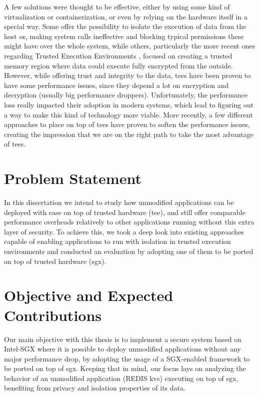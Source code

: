 A few solutions were thought to be effective, either by using some kind of virtualization or containerization, or even by relying on the hardware itself in a special way. 
Some \cite{virtGhostPaper}\cite{flickerPaper}\cite{mushiPaper}\cite{SeCagePaper}\cite{inkTagPaper}\cite{segoPaper} offer the possibility to isolate the execution of data from the host \gls{os}, making system calls ineffective and blocking typical permissions these might have over the whole system, while others, particularly the more recent ones regarding Trusted Execution Environments \cite{armTZPaper}\cite{amdPaper}\cite{sanctumPaper}\cite{intelSGX}, focused on creating a trusted memory region where data could execute fully encrypted from the outside. 
However, while offering trust and integrity to the data, \gls{tee}s have been proven to have some performance issues, since they depend a lot on encryption and decryption (usually big performance droppers). Unfortunately, the performance loss really impacted their adoption in modern systems, which lead to figuring out a way to make this kind of technology more viable. 
More recently, a few different approaches to place on top of \gls{tee}s have proven to soften the performance issues, creating the impression that we are on the right path to take the most advantage of \gls{tee}s. 


\section{Problem Statement}

In this dissertation we intend to study how unmodified applications can be deployed with ease on top of trusted hardware (\gls{tee}), and still offer comparable performance overheads relatively to other applications running without this extra layer of security. To achieve this, we took a deep look into existing approaches capable of enabling applications to run with isolation in trusted execution environments and conducted an evaluation by adopting one of them to be ported on top of trusted hardware (\gls{sgx}). 


\section{Objective and Expected Contributions} %
\label{sec:objectiveAndContibutions}
Our main objective with this thesis is to implement a secure system based on Intel-SGX
where it is possible to deploy unmodified applications without any major performance
drop, by adopting the usage of a SGX-enabled framework to be ported on top of \gls{sgx}. Keeping that in mind, our focus lays on analyzing the behavior of an unmodified application (REDIS \gls{kvs}) executing on top of \gls{sgx}, benefiting from privacy and isolation properties of its data.

